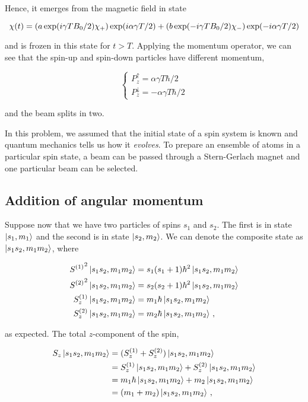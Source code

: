 \documentclass[12pt, titlepage]{article}
\begin{document}
Hence, it emerges from the magnetic field in state

\begin{equation*}
\chi(t) = \qty(a\exp(i\gamma  T B_0/2)\chi_+)\exp(i\alpha\gamma T/2) + \qty(b\exp(-i\gamma  T B_0/2)\chi_-)\exp(-i\alpha\gamma T/2)
\end{equation*}

and is frozen in this state for $t>T$. Applying the momentum operator, we can see that the spin-up and spin-down particles have different momentum,

\begin{equation}
	\left\{
	\begin{array}{l}
	P_{z}^{\uparrow} = \alpha \gamma T \hbar/2 \\
	P_{z}^{\downarrow} = -\alpha \gamma T \hbar/2
	\end{array}
	\right.
\end{equation}

and the beam splits in two.

In this problem, we assumed that the initial state of a spin system is known and quantum mechanics tells us how it \textit{evolves}. To prepare an ensemble of atoms in a particular spin state, a beam can be passed through a Stern-Gerlach magnet and one particular beam can be selected.

\subsection{Addition of angular momentum}
Suppose now that we have two particles of spins $s_1$ and $s_2$. The first is in state $\ket{s_1, m_1}$ and the second is in state $\ket{s_2, m_2}$. We can denote the composite state as $\ket{s_1s_2,m_1m_2}$, where

\begin{align*}
	{S^{(1)}}^2\ket{s_1s_2,m_1m_2} &= s_1(s_1+1)\hbar^2\ket{s_1s_2,m_1m_2} \\
	{S^{(2)}}^2\ket{s_1s_2,m_1m_2} &= s_2(s_2+1)\hbar^2\ket{s_1s_2,m_1m_2} \\
	S^{(1)}_{z}\ket{s_1s_2,m_1m_2} &= m_1\hbar\ket{s_1s_2,m_1m_2} \\
	S^{(2)}_{z}\ket{s_1s_2,m_1m_2} &= m_2\hbar\ket{s_1s_2,m_1m_2} \,,
\end{align*}

as expected. The total $z$-component of the spin,

\begin{align*}
	S_z\ket{s_1s_2,m_1m_2} &= (S^{(1)}_{z} + S^{(2)}_{z})\ket{s_1s_2,m_1m_2} \\
	&= S^{(1)}_{z}\ket{s_1s_2,m_1m_2} + S^{(2)}_{z}\ket{s_1s_2,m_1m_2} \\
	&= m_1\hbar\ket{s_1s_2,m_1m_2} + m_2\ket{s_1s_2,m_1m_2} \\
	&= (m_1+m_2)\ket{s_1s_2,m_1m_2} \,,
\end{align*}
\end{document}
